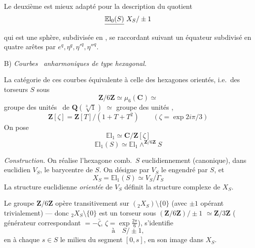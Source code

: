 \documentclass[11pt,a4paper]{article}
\begin{document}
Le deuxième est mieux adapté pour la description du quotient
\[
\struck{\mathbb{E}\mathrm{l}_0(S)}\ X_S/\pm 1
\]
qui est une sphère, subdivisée en  
, se raccordant suivant un équateur
 subdivisé en quatre arêtes par $e^{q}, \eta^{q},
\eta'^{q}, \eta''^{q}$.

B) \emph{Courbes} \ \emph{anharmoniques de type hexagonal.}

La catégorie de ces courbes équivalente à celle des hexagones orientés,
i.e.\ des torseurs $S$ sous
\[
\mathbf{Z}/6\mathbf{Z} \simeq \mu_6(\mathbf{C}) \simeq
\]
groupe des unités \ de $\mathbf{Q}(\sqrt[3]{1})$
$\simeq$ groupe des unités ,
\[
\mathbf{Z}[\zeta] = \mathbf{Z}[T]/(1 + T + T^{2}) \qquad
(\zeta = \exp 2i\pi/3)
\]
 On pose
\[
\mathbb{E}\mathrm{l}_1 \simeq \mathbf{C}/\mathbf{Z}[\zeta]
\]
\[
\mathbb{E}\mathrm{l}_1(S) \simeq \mathbb{E}\mathrm{l}_1
\wedge^{\mathbf{Z}/6\mathbf{Z}} S
\]

\emph{Construction.} On réalise l'hexagone comb.\ $S$ euclidiennement
(canonique), dans \struck{\ill{}}  euclidien $V_S$,
 le barycentre de $S$. On désigne par $V_S$ le  engendré par $S$, et
\[
X_S = \mathbb{E}\mathrm{l}_1(S) \simeq V_S/\Gamma_S
\]
La structure euclidienne \emph{orientée} de $V_S$ définit la structure
complexe de $X_S$.

Le groupe $\mathbf{Z}/6\mathbf{Z}$ opère transitivement sur
$({}_2X_S) \setminus \lbrace 0 \rbrace$ (avec $\pm 1$ opérant
trivialement) --- donc ${}_2X_S \setminus \lbrace 0 \rbrace$ est un
torseur sous $(\mathbf{Z}/6\mathbf{Z})/\pm 1$
$\simeq \mathbf{Z}/3\mathbf{Z}$ (\struck{\ill{}} générateur correspondant
$= -\bar{\zeta}$, $\zeta = \exp\frac{2\pi}{6}$),  s'identifie
\[
\text{à} \quad S/\pm 1,
\]
en  à chaque $s \in S$ le milieu du segment
$[0,s]$, en  son image dans $X_S$.
\end{document}
